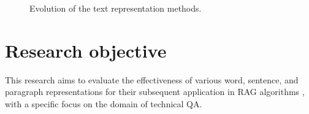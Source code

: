 \begin{figure}
 \centering
    
 \caption{Evolution of the text representation methods.}
  \label{fig:ecolution_text_representation}
\end{figure}

\section{Research objective}

This research aims to evaluate the effectiveness of various word, sentence, and paragraph representations for their subsequent application in \ac{RAG} algorithms \cite{lewis2021retrievalaugmented}, with a specific focus on the domain of technical \ac{QA}.